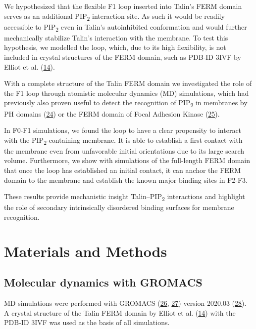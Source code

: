 \documentclass[
  twocolumn]{biophys-new-mod}
\begin{document}
We hypothesized that the flexible F1 loop inserted into Talin's FERM
domain serves as an additional PIP\textsubscript{2} interaction site. As
such it would be readily accessible to PIP\textsubscript{2} even in
Talin's autoinhibited conformation and would further mechanically
stabilize Talin's interaction with the membrane. To test this
hypothesis, we modelled the loop, which, due to its high flexibility, is
not included in crystal structures of the FERM domain, such as PDB-ID
3IVF by Elliot et al.
(\protect\hyperlink{ref-elliottStructureTalinHead2010}{14}).

With a complete structure of the Talin FERM domain we investigated the
role of the F1 loop through atomistic molecular dynamics (MD)
simulations, which had previously also proven useful to detect the
recognition of PIP\textsubscript{2} in membranes by PH domains
(\protect\hyperlink{ref-buyanMultiscaleSimulationsSuggest2016}{24}) or
the FERM domain of Focal Adhesion Kinase
(\protect\hyperlink{ref-zhouMechanismFocalAdhesion2015}{25}).

In F0-F1 simulations, we found the loop to have a clear propensity to
interact with the PIP\textsubscript{2}-containing membrane. It is able
to establish a first contact with the membrane even from unfavorable
initial orientations due to its large search volume. Furthermore, we
show with simulations of the full-length FERM domain that once the loop
has established an initial contact, it can anchor the FERM domain to the
membrane and establish the known major binding sites in F2-F3.

These results provide mechanistic insight Talin--PIP\textsubscript{2}
interactions and highlight the role of secondary intrinsically
disordered binding surfaces for membrane recognition.

\hypertarget{materials-and-methods}{%
\section{Materials and Methods}\label{materials-and-methods}}

\hypertarget{molecular-dynamics-with-gromacs}{%
\subsection{Molecular dynamics with
GROMACS}\label{molecular-dynamics-with-gromacs}}

MD simulations were performed with GROMACS
(\protect\hyperlink{ref-berendsenGROMACSMessagepassingParallel1995}{26},
\protect\hyperlink{ref-abrahamGROMACSHighPerformance2015}{27}) version
2020.03 (\protect\hyperlink{ref-lindahlGROMACS2020Source2020}{28}). A
crystal structure of the Talin FERM domain by Elliot et al.
(\protect\hyperlink{ref-elliottStructureTalinHead2010}{14}) with the
PDB-ID 3IVF was used as the basis of all simulations.
\end{document}
